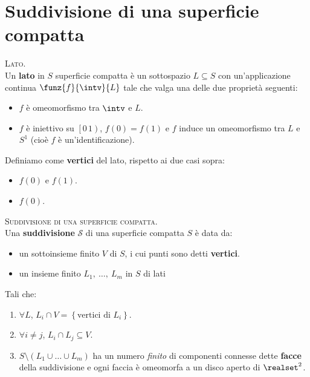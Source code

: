 \section{Suddivisione di una superficie compatta}
\begin{define}\textsc{Lato.}\\
	Un \textbf{lato} in $S$ superficie compatta è un sottospazio $L\subseteq S$ con un'applicazione continua $\funz{f}{\intv}{L}$ tale che valga una delle due proprietà seguenti:
	\begin{itemize}
		\item $f$ è omeomorfismo tra $\intv$ e $L$.
		\item $f$ è iniettivo su $\left[0\, 1\right)$, $f\left(0\right)=f\left(1\right)$ e $f$ induce un omeomorfismo tra $L$ e $S^1$ (cioè $f$ è un'identificazione).
	\end{itemize}
Definiamo come \textbf{vertici} del lato, rispetto ai due casi sopra:
\begin{itemize}
	\item $f\left(0\right)$ e $f\left(1\right)$.
	\item $f\left(0\right)$.
\end{itemize}
\vspace{-3mm}
\end{define}
\begin{define}\textsc{Suddivisione di una superficie compatta.}\\
	Una \textbf{suddivisione} $\mathcal
	S$ di una superficie compatta $S$ è data da:
	\begin{itemize}
		\item un sottoinsieme finito $V$ di $S$, i cui punti sono detti \textbf{vertici}.
		\item un insieme finito $L_1,\ \ldots,\ L_m$ in $S$ di lati
	\end{itemize}
Tali che:
\begin{enumerate}
	\item $\forall L$, $L_i\cap V=\left\{\text{vertici di }L_i\right\}$.
	\item $\forall i\neq j$, $L_i\cap L_j\subseteq V$.
	\item $S\setminus\left(L_1\cup\ldots\cup L_m\right)$ ha un numero \textit{finito} di componenti connesse dette \textbf{facce} della suddivisione e ogni faccia è omeomorfa a un disco aperto di $\realset^2$.
\end{enumerate}
\vspace{-3mm}
\end{define}	
